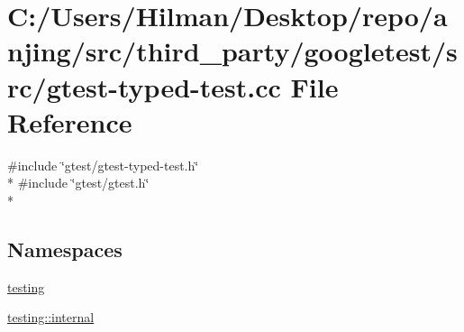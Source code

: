 \hypertarget{gtest-typed-test_8cc}{}\section{C\+:/\+Users/\+Hilman/\+Desktop/repo/anjing/src/third\+\_\+party/googletest/src/gtest-\/typed-\/test.cc File Reference}
\label{gtest-typed-test_8cc}
{\ttfamily \#include \char`\"{}gtest/gtest-\/typed-\/test.\+h\char`\"{}}\\*
{\ttfamily \#include \char`\"{}gtest/gtest.\+h\char`\"{}}\\*
\subsection*{Namespaces}
\begin{DoxyCompactItemize}
\item 
 \hyperlink{namespacetesting}{testing}
\item 
 \hyperlink{namespacetesting_1_1internal}{testing\+::internal}
\end{DoxyCompactItemize}
